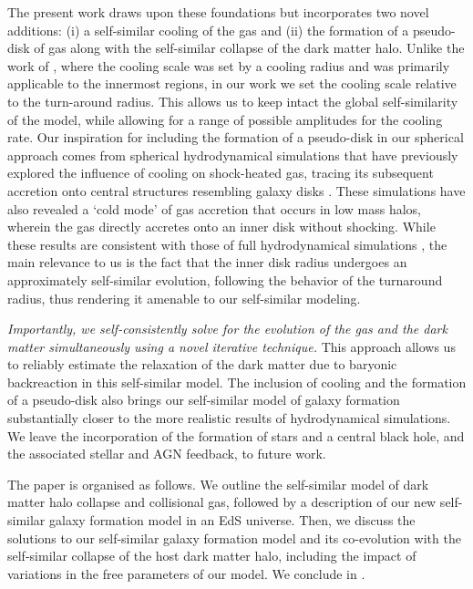 The present work draws upon these foundations but incorporates two novel additions: (i) a self-similar cooling of the gas and (ii) the formation of a pseudo-disk of gas along with the self-similar collapse of the dark matter halo. Unlike the work of \cite{1989Bertschinger}, where the cooling scale was set by a cooling radius and was primarily applicable to the innermost regions, in our work we set the cooling scale relative to the turn-around radius. This allows us to keep intact the global self-similarity of the model, while allowing for a range of possible amplitudes for the cooling rate. Our inspiration for including the formation of a pseudo-disk in our spherical approach comes from spherical hydrodynamical simulations that have previously explored the influence of cooling on shock-heated gas, tracing its subsequent accretion onto central structures resembling galaxy disks \cite{2006Dekel&Birnboim}. These simulations have also revealed a `cold mode' of gas accretion that occurs in low mass halos, wherein the gas directly accretes onto an inner disk without shocking. While these results are consistent with those of full hydrodynamical simulations \cite{2005Keres_KWD},
the main relevance to us is the fact that the inner disk radius undergoes an approximately self-similar evolution, following the behavior of the turnaround radius, thus rendering it amenable to our self-similar modeling.

\emph{Importantly, we self-consistently solve for the evolution of the gas and the dark matter simultaneously using a novel iterative technique.} This approach allows us to reliably estimate the relaxation of the dark matter due to baryonic backreaction in this self-similar model. The inclusion of cooling and the formation of a pseudo-disk also brings our self-similar model of galaxy formation substantially closer to the more realistic results of hydrodynamical simulations. We leave the incorporation of the formation of stars and a central black hole, and the associated stellar and AGN feedback, to future work.

The paper is organised as follows. We outline the self-similar model of dark matter halo collapse and collisional gas, followed by a description of our new self-similar galaxy formation model in an EdS universe. Then, we discuss the solutions to our self-similar galaxy formation model and its co-evolution with the self-similar collapse of the host dark matter halo, including the impact of variations in the free parameters of our model. We conclude in .












